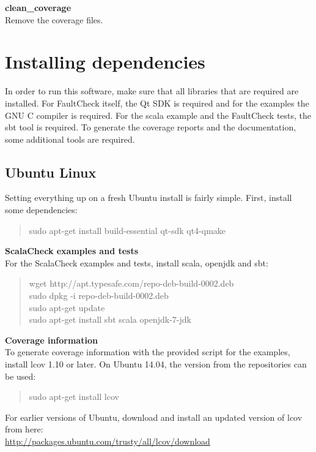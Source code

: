 \textbf{clean\_coverage}\\Remove the coverage files.

\section{Installing dependencies}\label{installing-dependencies}

In order to run this software, make sure that all libraries that are
required are installed. For FaultCheck itself, the Qt SDK is required
and for the examples the GNU C compiler is required. For the scala
example and the FaultCheck tests, the sbt tool is required. To generate
the coverage reports and the documentation, some additional tools are
required.

\subsection{Ubuntu Linux}\label{ubuntu-linux}

Setting everything up on a fresh Ubuntu install is fairly simple. First,
install some dependencies:

\begin{quote}
sudo apt-get install build-essential qt-sdk qt4-qmake
\end{quote}

\textbf{ScalaCheck examples and tests}\\For the ScalaCheck examples and
tests, install scala, openjdk and sbt:

\begin{quote}
wget http://apt.typesafe.com/repo-deb-build-0002.deb\\sudo dpkg -i
repo-deb-build-0002.deb\\sudo apt-get update\\sudo apt-get install sbt
scala openjdk-7-jdk
\end{quote}

\textbf{Coverage information}\\To generate coverage information with the
provided script for the examples, install lcov 1.10 or later. On Ubuntu
14.04, the version from the repositories can be used:

\begin{quote}
sudo apt-get install lcov
\end{quote}

For earlier versions of Ubuntu, download and install an updated version
of lcov from
here:\\\url{http://packages.ubuntu.com/trusty/all/lcov/download}

